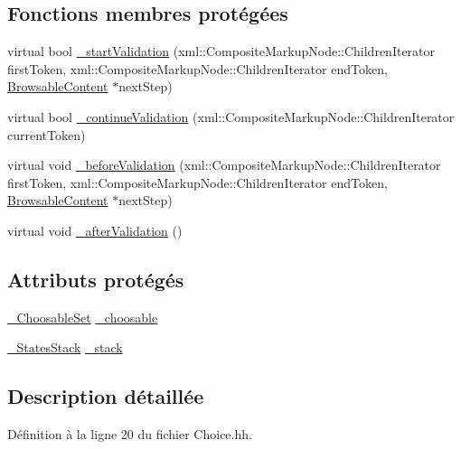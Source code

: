 \subsection*{Fonctions membres protégées}
\begin{DoxyCompactItemize}
\item 
virtual bool \hyperlink{classdtd_1_1_choice_ab8d562a9912376d95a99a2ce3c9cd7f0}{\_\-startValidation} (xml::CompositeMarkupNode::ChildrenIterator firstToken, xml::CompositeMarkupNode::ChildrenIterator endToken, \hyperlink{classdtd_1_1_browsable_content}{BrowsableContent} $\ast$nextStep)
\item 
virtual bool \hyperlink{classdtd_1_1_choice_a633d6ed16e627cfe31f602e7457bae72}{\_\-continueValidation} (xml::CompositeMarkupNode::ChildrenIterator currentToken)
\item 
virtual void \hyperlink{classdtd_1_1_choice_a4d7c2672e20a84741815e7065173b4e5}{\_\-beforeValidation} (xml::CompositeMarkupNode::ChildrenIterator firstToken, xml::CompositeMarkupNode::ChildrenIterator endToken, \hyperlink{classdtd_1_1_browsable_content}{BrowsableContent} $\ast$nextStep)
\item 
virtual void \hyperlink{classdtd_1_1_choice_a9183a9eb47b76a61ff77f89041751853}{\_\-afterValidation} ()
\end{DoxyCompactItemize}
\subsection*{Attributs protégés}
\begin{DoxyCompactItemize}
\item 
\hyperlink{classdtd_1_1_choice_a07352a0a4e78923e41370e6b00af1c86}{\_\-ChoosableSet} \hyperlink{classdtd_1_1_choice_aa6eb4aa595f08f84b243d349f4fbdb2d}{\_\-choosable}
\item 
\hyperlink{classdtd_1_1_choice_a804cc83d915d4a96b04a850cf99b7b51}{\_\-StatesStack} \hyperlink{classdtd_1_1_choice_a02a69def9aec60304827d57342158be6}{\_\-stack}
\end{DoxyCompactItemize}


\subsection{Description détaillée}


Définition à la ligne 20 du fichier Choice.hh.



